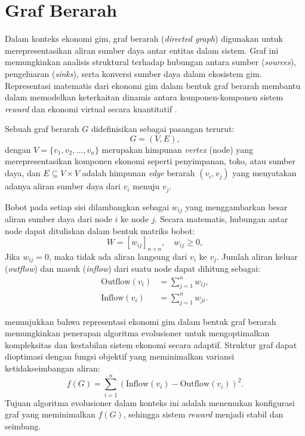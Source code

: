 \section{Graf Berarah}\label{}

Dalam konteks ekonomi gim, graf berarah (\textit{directed graph}) digunakan untuk merepresentasikan aliran sumber daya antar entitas dalam sistem. Graf ini memungkinkan analisis struktural terhadap hubungan antara sumber (\textit{sources}), pengeluaran (\textit{sinks}), serta konversi sumber daya dalam ekosistem gim. Representasi matematis dari ekonomi gim dalam bentuk graf berarah membantu dalam memodelkan keterkaitan dinamis antara komponen-komponen sistem \textit{reward} dan ekonomi virtual secara kuantitatif \citep{Rogers2023}.

Sebuah graf berarah $G$ didefinisikan sebagai pasangan terurut:
\begin{equation}
    G = (V, E),
\end{equation}
dengan $V = \{v_1, v_2, \dots, v_n\}$ merupakan himpunan \textit{vertex} (node) yang merepresentasikan komponen ekonomi seperti penyimpanan, toko, atau sumber daya, dan $E \subseteq V \times V$ adalah himpunan \textit{edge} berarah $(v_i, v_j)$ yang menyatakan adanya aliran sumber daya dari $v_i$ menuju $v_j$.

Bobot pada setiap sisi dilambangkan sebagai $w_{ij}$ yang menggambarkan besar aliran sumber daya dari node $i$ ke node $j$. Secara matematis, hubungan antar node dapat dituliskan dalam bentuk matriks bobot:
\begin{equation}
    W = [w_{ij}]_{n \times n}, \quad w_{ij} \ge 0,
\end{equation}
Jika $w_{ij} = 0$, maka tidak ada aliran langsung dari $v_i$ ke $v_j$. Jumlah aliran keluar (\textit{outflow}) dan masuk (\textit{inflow}) dari suatu node dapat dihitung sebagai:
\begin{align}
    \text{Outflow}(v_i) &= \sum_{j=1}^{n} w_{ij}, \\
    \text{Inflow}(v_i) &= \sum_{j=1}^{n} w_{ji}.
\end{align}

\citet{Rogers2023} menunjukkan bahwa representasi ekonomi gim dalam bentuk graf berarah memungkinkan penerapan algoritma evolusioner untuk mengoptimalkan kompleksitas dan kestabilan sistem ekonomi secara adaptif. Struktur graf dapat dioptimasi dengan fungsi objektif yang meminimalkan variansi ketidakseimbangan aliran:
\begin{equation}
    f(G) = \sum_{i=1}^{n} \left( \text{Inflow}(v_i) - \text{Outflow}(v_i) \right)^2.
\end{equation}
Tujuan algoritma evolusioner dalam konteks ini adalah menemukan konfigurasi graf yang meminimalkan $f(G)$, sehingga sistem \textit{reward} menjadi stabil dan seimbang.

